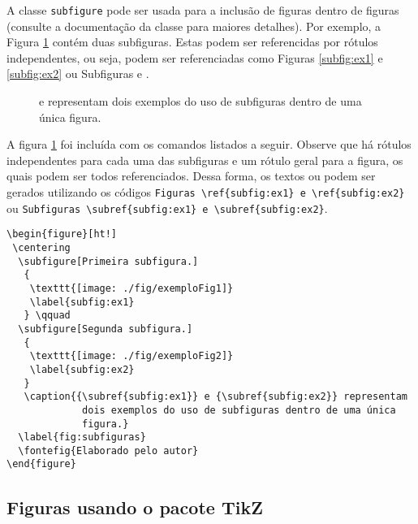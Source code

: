 A classe \verb|subfigure| pode ser usada para a inclusão de figuras dentro de figuras (consulte a documentação da classe para maiores detalhes). Por exemplo, a Figura \ref{fig:subfiguras} contém duas subfiguras. Estas podem ser referencidas por rótulos independentes, ou seja, podem ser referenciadas como Figuras \ref{subfig:ex1} e \ref{subfig:ex2} ou Subfiguras  e .
\begin{figure}[ht!]
 \centering
   \qquad
   \caption[Subfiguras]{{} e {} representam dois exemplos do uso de subfiguras dentro de uma única figura.}
  \label{fig:subfiguras}
\end{figure}

A figura \ref{fig:subfiguras} foi incluída com os comandos listados a seguir. Observe que há rótulos independentes para cada uma das subfiguras e um rótulo geral para a figura, os quais podem ser todos referenciados. Dessa forma, os textos  ou  podem ser gerados utilizando os códigos \verb|Figuras \ref{subfig:ex1} e \ref{subfig:ex2}| ou \verb|Subfiguras \subref{subfig:ex1} e \subref{subfig:ex2}|.

\begin{verbatim}
\begin{figure}[ht!]
 \centering
  \subfigure[Primeira subfigura.]
   {
    \texttt{[image: ./fig/exemploFig1]}
    \label{subfig:ex1}
   } \qquad
  \subfigure[Segunda subfigura.]
   {
    \texttt{[image: ./fig/exemploFig2]}
    \label{subfig:ex2}
   }
   \caption{{\subref{subfig:ex1}} e {\subref{subfig:ex2}} representam
             dois exemplos do uso de subfiguras dentro de uma única
             figura.}
  \label{fig:subfiguras}
  \fontefig{Elaborado pelo autor}
\end{figure}
\end{verbatim}

\subsection{Figuras usando o pacote TikZ}

